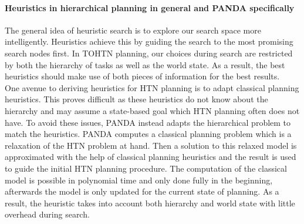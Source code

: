 \paragraph{Heuristics in hierarchical planning in general and PANDA specifically}
\label{improv: crowd heuristic}
The general idea of heuristic search is to explore our search space more intelligently. Heuristics achieve this by guiding the search to the most promising search nodes first.
In TOHTN planning, our choices during search are restricted by both the hierarchy of tasks as well as the world state. As a result, the best heuristics should make use of both pieces of information for the best results. \\
One avenue to deriving heuristics for HTN planning is to adapt classical planning heuristics. This proves difficult as these heuristics do not know about the hierarchy and may assume a state-based goal which HTN planning often does not have. To avoid these issues, PANDA instead adapts the hierarchical problem to match the heuristics. PANDA computes a classical planning problem which is a relaxation of the HTN problem at hand. Then a solution to this relaxed model is approximated with the help of classical planning heuristics and the result is used to guide the initial HTN planning procedure. The computation of the classical model is possible in polynomial time and only done fully in the beginning, afterwards the model is only updated for the current state of planning. As a result, the heuristic takes into account both hierarchy and world state with little overhead during search.

